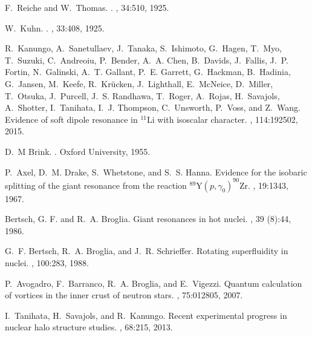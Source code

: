 \documentclass[a4paper,11pt]{article}
\numberwithin{equation}{section}
\numberwithin{figure}{section}
\numberwithin{table}{section}
\begin{document}
\begin{thebibliography}{10}
	F.~Reiche and W.~Thomas.
	.
	, 34:510, 1925.
	
	W.~Kuhn.
	.
	, 33:408, 1925.
	
	R.~Kanungo, A.~Sanetullaev, J.~Tanaka, S.~Ishimoto, G.~Hagen, T.~Myo,
	T.~Suzuki, C.~Andreoiu, P.~Bender, A.~A. Chen, B.~Davids, J.~Fallis, J.~P.
	Fortin, N.~Galinski, A.~T. Gallant, P.~E. Garrett, G.~Hackman, B.~Hadinia,
	G.~Jansen, M.~Keefe, R.~Kr\"ucken, J.~Lighthall, E.~McNeice, D.~Miller,
	T.~Otsuka, J.~Purcell, J.~S. Randhawa, T.~Roger, A.~Rojas, H.~Savajols,
	A.~Shotter, I.~Tanihata, I.~J. Thompson, C.~Unsworth, P.~Voss, and Z.~Wang.
	\newblock Evidence of soft dipole resonance in $^{11}\mathrm{Li}$ with
	isoscalar character.
	, 114:192502, 2015.
	
	D.~M Brink.
	.
	\newblock Oxford University, 1955.
	
	P.~Axel, D.~M. Drake, S.~Whetstone, and S.~S. Hanna.
	\newblock Evidence for the isobaric splitting of the giant resonance from the
	reaction $^{89}\mathrm{Y}(p, {\ensuremath{\gamma}}_{0})^{90}\mathrm{Zr}$.
	, 19:1343, 1967.
	
	{Bertsch, G. F.} and R.~A. Broglia.
	\newblock Giant resonances in hot nuclei.
	, 39 (8):44, 1986.
	
	G.~F. Bertsch, R.~A. Broglia, and J.~R. Schrieffer.
	\newblock Rotating superfluidity in nuclei.
	, 100:283, 1988.
	
	P.~Avogadro, F.~Barranco, R.~A. Broglia, and E.~Vigezzi.
	\newblock Quantum calculation of vortices in the inner crust of neutron stars.
	, 75:012805, 2007.
	
	I.~Tanihata, H.~Savajols, and R.~Kanungo.
	\newblock Recent experimental progress in nuclear halo structure studies.
	, 68:215, 2013.
	
\end{thebibliography}
\end{document}
